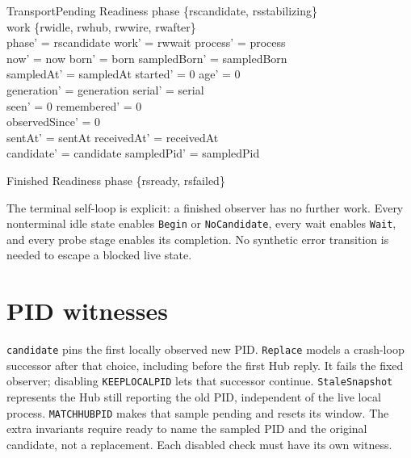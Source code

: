 \documentclass[a4paper,10pt,fleqn]{article}
\begin{document}
\begin{schema}{TransportPending}
  \Delta Readiness
\where
  phase \in \{rscandidate, rsstabilizing\} \\
  work \in \{rwidle, rwhub, rwwire, rwafter\} \\
  phase' = rscandidate \land work' = rwwait \land process' = process \\
  now' = now \land born' = born \land sampledBorn' = sampledBorn \\
  sampledAt' = sampledAt \land started' = 0 \land age' = 0 \\
  generation' = generation \land serial' = serial \\
  seen' = 0 \land remembered' = 0 \\
  observedSince' = 0 \\
  sentAt' = sentAt \land receivedAt' = receivedAt \\
  candidate' = candidate \land sampledPid' = sampledPid
\end{schema}
\begin{schema}{Finished}
  \Xi Readiness
\where
  phase \in \{rsready, rsfailed\}
\end{schema}
The terminal self-loop is explicit: a finished observer has no further work.
Every nonterminal idle state enables \texttt{Begin} or \texttt{NoCandidate},
every wait enables \texttt{Wait}, and every probe stage enables its completion.
No synthetic error transition is needed to escape a blocked live state.

\section{PID witnesses}
\texttt{candidate} pins the first locally observed new PID. \texttt{Replace}
models a crash-loop successor after that choice, including before the first
Hub reply. It fails the fixed observer; disabling \texttt{KEEPLOCALPID} lets
that successor continue. \texttt{StaleSnapshot} represents the Hub still
reporting the old PID, independent of the live local process.
\texttt{MATCHHUBPID} makes that sample pending and resets its window.
The extra invariants require ready to name the sampled PID and the original
candidate, not a replacement. Each disabled check must have its own witness.
\end{document}
